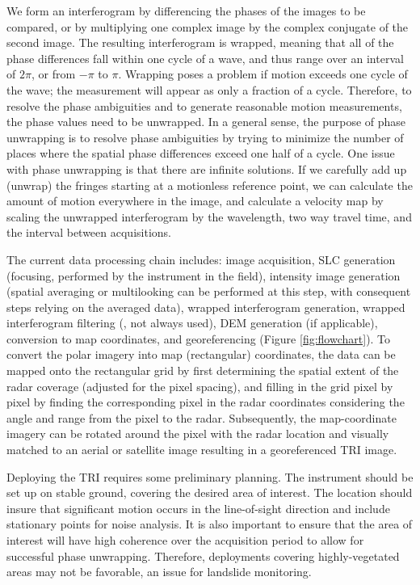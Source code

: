 We form an interferogram by differencing the phases of the images to be compared, or by multiplying one complex image by the complex conjugate of the second image. The resulting interferogram is wrapped, meaning that all of the phase differences fall within one cycle of a wave, and thus range over an interval of $2\pi$, or from $-\pi$ to $\pi$. Wrapping poses a problem if motion exceeds one cycle of the wave; the measurement will appear as only a fraction of a cycle. Therefore, to resolve the phase ambiguities and to generate reasonable motion measurements, the phase values need to be unwrapped. In a general sense, the purpose of phase unwrapping is to resolve phase ambiguities by trying to minimize the number of places where the spatial phase differences exceed one half of a cycle. One issue with phase unwrapping is that there are infinite solutions. If we carefully add up (unwrap) the fringes starting at a motionless reference point, we can calculate the amount of motion everywhere in the image, and calculate a velocity map by scaling the unwrapped interferogram by the wavelength, two way travel time, and the interval between acquisitions.


The current data processing chain includes: image acquisition, SLC generation (focusing, performed by the instrument in the field), intensity image generation (spatial averaging or multilooking can be performed at this step, with consequent steps relying on the averaged data), wrapped interferogram generation, wrapped interferogram filtering (\citet{goldstein1998radar}, not always used), DEM generation (if applicable), conversion to map coordinates, and georeferencing (Figure \ref{fig:flowchart}).   To convert the polar imagery into map (rectangular) coordinates, the data can be mapped onto the rectangular grid by first determining the spatial extent of the radar coverage (adjusted for the pixel spacing), and  filling in the grid pixel by pixel by finding the corresponding pixel in the radar coordinates considering the angle and range from the pixel to the radar. Subsequently, the map-coordinate imagery can be  rotated around the pixel with the radar location and visually matched to an aerial or satellite image resulting in a georeferenced TRI image. 


Deploying the TRI requires some preliminary planning. The instrument should be set up on stable ground, covering the desired area of interest. The location should insure that significant motion occurs in the line-of-sight direction and include stationary points for noise analysis. It is also important to ensure that the area of interest will have high coherence over the acquisition period to allow for successful phase unwrapping. Therefore, deployments covering highly-vegetated areas may not be favorable, an issue for landslide monitoring.



